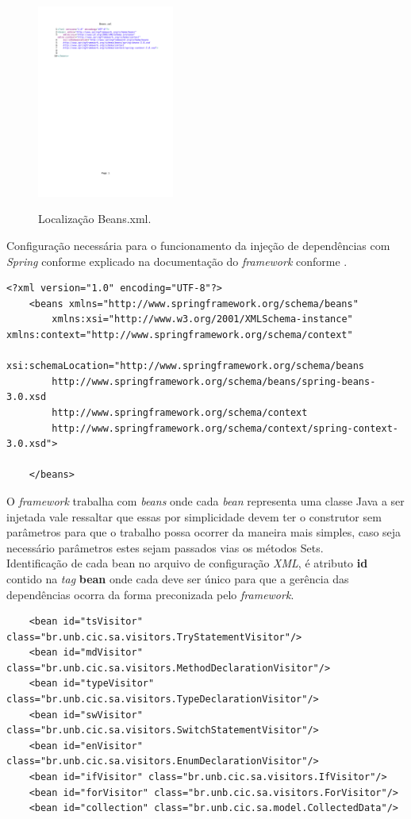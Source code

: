 \begin{figure}[h]
	\center
	\includegraphics[width=0.4\textwidth]{Imagens/Beans}
	\label{fig:ProjectAnalyser}
	\caption{Localização Beans.xml.}
\end{figure}
\clearpage

Configuração necessária para o funcionamento da injeção de dependências com {\it Spring} conforme explicado na documentação do {\it framework} conforme \cite{SPRING_REF}.\\
\begin{lstlisting}
<?xml version="1.0" encoding="UTF-8"?>
	<beans xmlns="http://www.springframework.org/schema/beans"
		xmlns:xsi="http://www.w3.org/2001/XMLSchema-instance" xmlns:context="http://www.springframework.org/schema/context"
		xsi:schemaLocation="http://www.springframework.org/schema/beans 
		http://www.springframework.org/schema/beans/spring-beans-3.0.xsd
		http://www.springframework.org/schema/context 
		http://www.springframework.org/schema/context/spring-context-3.0.xsd">

	</beans>
\end{lstlisting}


O {\it framework} trabalha com \textit{beans} onde cada \textit{bean} representa uma classe Java a ser injetada vale ressaltar que essas por simplicidade devem ter o construtor sem parâmetros para que o trabalho possa ocorrer da maneira mais simples, caso seja necessário parâmetros estes sejam passados vias os métodos Sets.\\

Identificação de cada bean no arquivo de configuração \textit{XML}, é atributo \textbf{id} contido na {\it tag} \textbf{bean} onde cada deve ser único para que a gerência das dependências ocorra da forma preconizada pelo {\it framework}.\\
\begin{lstlisting}
	<bean id="tsVisitor" class="br.unb.cic.sa.visitors.TryStatementVisitor"/>
	<bean id="mdVisitor" class="br.unb.cic.sa.visitors.MethodDeclarationVisitor"/>
	<bean id="typeVisitor" class="br.unb.cic.sa.visitors.TypeDeclarationVisitor"/>
	<bean id="swVisitor" class="br.unb.cic.sa.visitors.SwitchStatementVisitor"/>
	<bean id="enVisitor" class="br.unb.cic.sa.visitors.EnumDeclarationVisitor"/>
	<bean id="ifVisitor" class="br.unb.cic.sa.visitors.IfVisitor"/>
	<bean id="forVisitor" class="br.unb.cic.sa.visitors.ForVisitor"/>
	<bean id="collection" class="br.unb.cic.sa.model.CollectedData"/>
\end{lstlisting}
\clearpage

